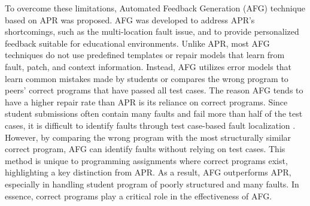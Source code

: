 \documentclass[10pt,conference]{IEEEtran}
\begin{document}
    To overcome these limitations, Automated Feedback Generation (AFG) technique based on APR was proposed. AFG was developed to address APR's shortcomings, such as the multi-location fault issue, and to provide personalized feedback suitable for educational environments. Unlike APR, most AFG techniques \cite{hu2019re, wang2018search, gulwani2018automated, li2022generating, pu2016sk_p, heo2023referent,singh2013automated,mechtaev2018semantic,ahmed2022verifix,d2016qlose,choi2021automated,song2021context,rolim2017learning,kaleeswaran2016semi} do not use predefined templates \cite{liu2019tbar} or repair models \cite{li2022transrepair} that learn from fault, patch, and context information. Instead, AFG utilizes error models \cite{singh2013automated} that learn common mistakes made by students or compares the wrong program to peers' correct programs that have passed all test cases. The reason AFG tends to have a higher repair rate than APR is its reliance on correct programs. Since student submissions often contain many faults and fail more than half of the test cases, it is difficult to identify faults through test case-based fault localization \cite{yi2017feasibility}. However, by comparing the wrong program with the most structurally similar correct program, AFG can identify faults without relying on test cases. This method is unique to programming assignments where correct programs exist, highlighting a key distinction from APR. As a result, AFG outperforms APR, especially in handling student program of poorly structured and many faults. In essence, correct programs play a critical role in the effectiveness of AFG.
\end{document}
